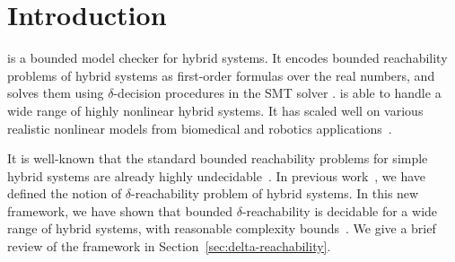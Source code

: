\section{Introduction}\label{sec:intro}


\dReach{} is a bounded model checker for hybrid systems. It encodes
bounded reachability problems of hybrid systems as first-order
formulas over the real numbers, and solves them using
$\delta$-decision procedures in the SMT solver \dReal{}. \dReach{} is
able to handle a wide range of highly nonlinear hybrid systems. It has
scaled well on various realistic nonlinear models from biomedical and
robotics applications~\cite{}.

It is well-known that the standard bounded reachability problems for
simple hybrid systems are already highly
undecidable~\cite{DBLP:conf/rex/AlurD91,DBLP:conf/hybrid/AlurCHH92}. In
previous work~\cite{}, we have defined the notion of
$\delta$-reachability problem of hybrid systems. In this new
framework, we have shown that bounded $\delta$-reachability is
decidable for a wide range of hybrid systems, with reasonable
complexity bounds~\cite{}. We give a brief review of the framework in
Section~\ref{sec:delta-reachability}.

